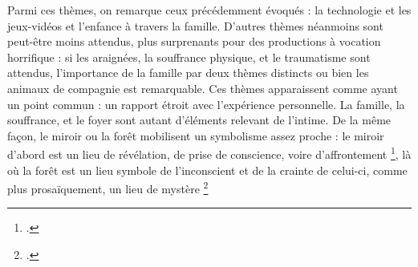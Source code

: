\documentclass[12pt,a4paper,oneside,titlepage]{book} %
\begin{document}
	Parmi ces thèmes, on remarque ceux précédemment évoqués : la technologie et les jeux-vidéos et l'enfance à travers la famille. D'autres thèmes néanmoins sont peut-être moins attendus, plus surprenants pour des productions à vocation horrifique : si les araignées, la souffrance physique, et le traumatisme sont attendus, l'importance de la famille par deux thèmes distincts ou bien les animaux de compagnie est remarquable. 
	Ces thèmes apparaissent comme ayant un point commun : un rapport étroit avec l'expérience personnelle. La famille, la souffrance, et le foyer sont autant d'éléments relevant de l'intime. 
	De la même façon, le miroir ou la forêt mobilisent un symbolisme assez proche : le miroir d'abord est un lieu de révélation, de prise de conscience, voire d'affrontement \footcite[voir p.639, article "Miroir"]{chevalier_dictionnaire_1990}, là où la forêt est un lieu symbole de l'inconscient et de la crainte de celui-ci, comme plus prosaïquement, un lieu de mystère \footcite[voir p.455, article "Forêt"]{chevalier_dictionnaire_1990}
\end{document}
